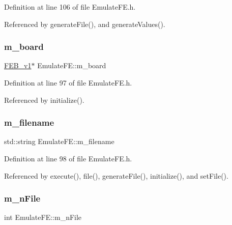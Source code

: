 Definition at line 106 of file Emulate\+F\+E.\+h.



Referenced by generate\+File(), and generate\+Values().

\mbox{\label{classEmulateFE_a6f3c6a104235b167e4465f4169cf8304}} 
\subsubsection{\texorpdfstring{m\+\_\+board}{m\_board}}
{\footnotesize\ttfamily \hyperlink{classFEB__v1}{F\+E\+B\+\_\+v1}$\ast$ Emulate\+F\+E\+::m\+\_\+board\hspace{0.3cm}{\ttfamily [private]}}



Definition at line 97 of file Emulate\+F\+E.\+h.



Referenced by initialize().

\mbox{\label{classEmulateFE_a103fedea9eb5d3963573f9120cb81a68}} 
\subsubsection{\texorpdfstring{m\+\_\+filename}{m\_filename}}
{\footnotesize\ttfamily std\+::string Emulate\+F\+E\+::m\+\_\+filename\hspace{0.3cm}{\ttfamily [private]}}



Definition at line 98 of file Emulate\+F\+E.\+h.



Referenced by execute(), file(), generate\+File(), initialize(), and set\+File().

\mbox{\label{classEmulateFE_a04ed956f5992c36590dd5a6abc19de2c}} 
\subsubsection{\texorpdfstring{m\+\_\+n\+File}{m\_nFile}}
{\footnotesize\ttfamily int Emulate\+F\+E\+::m\+\_\+n\+File\hspace{0.3cm}{\ttfamily [private]}}



